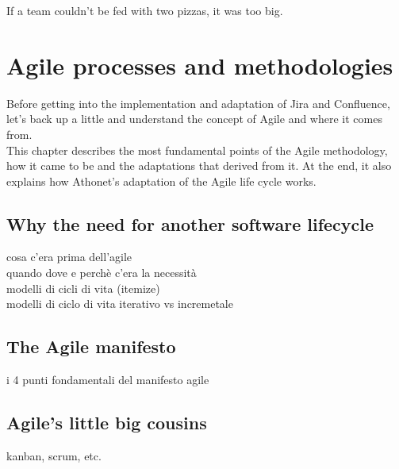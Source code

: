 \begin{savequote}[75mm]
If a team couldn’t be fed with two pizzas, it was too big.
\end{savequote}




\chapter{Agile processes and methodologies}

Before getting into the implementation and adaptation of Jira and Confluence, let's back up a little and understand the concept of Agile and where it comes from.\\
This chapter describes the most fundamental points of the Agile methodology, how it came to be and the adaptations that derived from it.
At the end, it also explains how Athonet's adaptation of the Agile life cycle works.

\section{Why the need for another software lifecycle}
	cosa c'era prima dell'agile\\
	quando dove e perchè c'era la necessità\\
	modelli di cicli di vita (itemize)\\
	modelli di ciclo di vita iterativo vs incremetale


\section{The Agile manifesto}
	i 4 punti fondamentali del manifesto agile

\section{Agile's little big cousins}
	kanban, scrum, etc.
	

